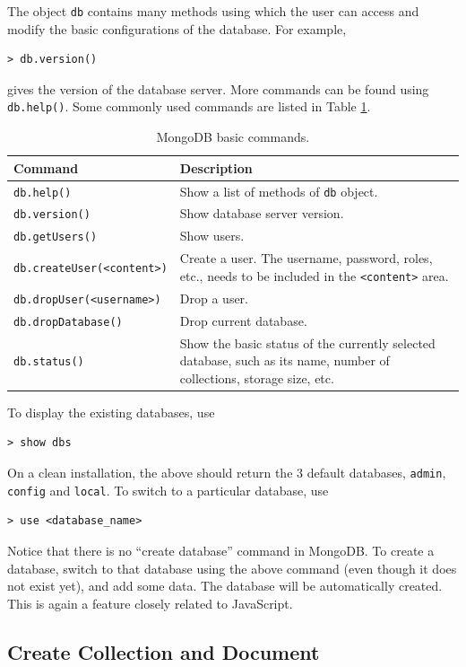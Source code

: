 The object \verb|db| contains many methods using which the user can access and modify the basic configurations of the database. For example,
\begin{lstlisting}
> db.version()
\end{lstlisting}
gives the version of the database server. More commands can be found using \verb|db.help()|. Some commonly used commands are listed in Table \ref{ch:db:tab:mongodbbasics}.
\begin{table}
	\centering \caption{MongoDB basic commands.}\label{ch:db:tab:mongodbbasics}
	\begin{tabularx}{\textwidth}{lX}
		\hline
		Command & Description \\ \hline
        \verb|db.help()| & Show a list of methods of \verb|db| object. \\ 
		\verb|db.version()| & Show database server version. \\ 
        \verb|db.getUsers()| & Show users. \\ 
        \verb|db.createUser(<content>)| & Create a user. The username, password, roles, etc., needs to be included in the \verb|<content>| area. \\ 
        \verb|db.dropUser(<username>)| & Drop a user. \\ 
        \verb|db.dropDatabase()| & Drop current database. \\ 
		\verb|db.status()| & Show the basic status of the currently selected database, such as its name, number of collections, storage size, etc.  \\
		 \hline
	\end{tabularx}
\end{table}

To display the existing databases, use
\begin{lstlisting}
> show dbs
\end{lstlisting}
On a clean installation, the above should return the 3 default databases, \verb|admin|, \verb|config| and \verb|local|. To switch to a particular database, use
\begin{lstlisting}
> use <database_name>
\end{lstlisting}
Notice that there is no ``create database'' command in MongoDB. To create a database, switch to that database using the above command (even though it does not exist yet), and add some data. The database will be automatically created. This is again a feature closely related to JavaScript.

\subsection{Create Collection and Document}

